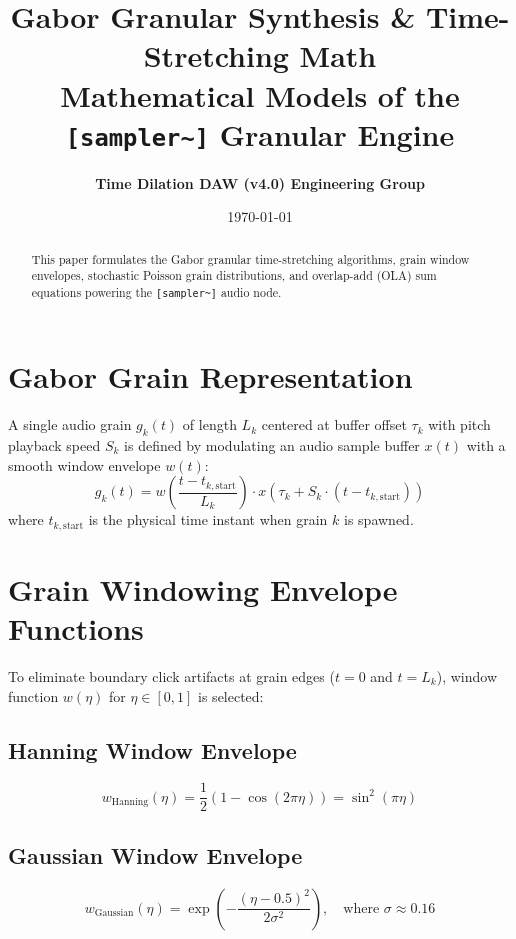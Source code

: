 \documentclass[11pt,a4paper]{article}
\title{\textbf{\Huge Gabor Granular Synthesis \& Time-Stretching Math}\\[0.5em]
\Large Mathematical Models of the \texttt{[sampler\textasciitilde{}]} Granular Engine}
\author{\textbf{Time Dilation DAW (v4.0) Engineering Group}}
\date{\today}
\begin{document}
\maketitle

\begin{abstract}
This paper formulates the Gabor granular time-stretching algorithms, grain window envelopes, stochastic Poisson grain distributions, and overlap-add (OLA) sum equations powering the \texttt{[sampler\textasciitilde{}]} audio node.
\end{abstract}

\section{Gabor Grain Representation}
A single audio grain $g_k(t)$ of length $L_k$ centered at buffer offset $\tau_k$ with pitch playback speed $S_k$ is defined by modulating an audio sample buffer $x(t)$ with a smooth window envelope $w(t)$:
\begin{equation}
g_k(t) = w\left(\frac{t - t_{k, \text{start}}}{L_k}\right) \cdot x\left(\tau_k + S_k \cdot (t - t_{k, \text{start}})\right)
\end{equation}
where $t_{k, \text{start}}$ is the physical time instant when grain $k$ is spawned.

\section{Grain Windowing Envelope Functions}
To eliminate boundary click artifacts at grain edges ($t = 0$ and $t = L_k$), window function $w(\eta)$ for $\eta \in [0, 1]$ is selected:

\subsection{Hanning Window Envelope}
\begin{equation}
w_{\text{Hanning}}(\eta) = \frac{1}{2} \left( 1 - \cos\left(2\pi \eta\right) \right) = \sin^2(\pi \eta)
\end{equation}

\subsection{Gaussian Window Envelope}
\begin{equation}
w_{\text{Gaussian}}(\eta) = \exp\left( -\frac{(\eta - 0.5)^2}{2\sigma^2} \right), \quad \text{where } \sigma \approx 0.16
\end{equation}
\end{document}
